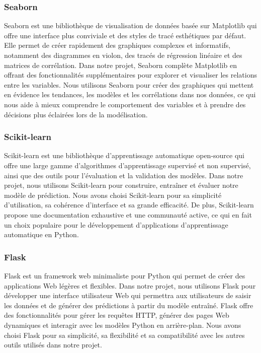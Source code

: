 \subsubsection{Seaborn}
Seaborn est une bibliothèque de visualisation de données basée sur Matplotlib qui offre une interface plus conviviale et des styles de tracé esthétiques par défaut. Elle permet de créer rapidement des graphiques complexes et informatifs, notamment des diagrammes en violon, des tracés de régression linéaire et des matrices de corrélation. Dans notre projet, Seaborn complète Matplotlib en offrant des fonctionnalités supplémentaires pour explorer et visualiser les relations entre les variables. Nous utilisons Seaborn pour créer des graphiques qui mettent en évidence les tendances, les modèles et les corrélations dans nos données, ce qui nous aide à mieux comprendre le comportement des variables et à prendre des décisions plus éclairées lors de la modélisation.

\subsubsection{Scikit-learn}
Scikit-learn est une bibliothèque d'apprentissage automatique open-source qui offre une large gamme d'algorithmes d'apprentissage supervisé et non supervisé, ainsi que des outils pour l'évaluation et la validation des modèles. Dans notre projet, nous utilisons Scikit-learn pour construire, entraîner et évaluer notre modèle de prédiction. Nous avons choisi Scikit-learn pour sa simplicité d'utilisation, sa cohérence d'interface et sa grande efficacité. De plus, Scikit-learn propose une documentation exhaustive et une communauté active, ce qui en fait un choix populaire pour le développement d'applications d'apprentissage automatique en Python.

\subsubsection{Flask}
Flask est un framework web minimaliste pour Python qui permet de créer des applications Web légères et flexibles. Dans notre projet, nous utilisons Flask pour développer une interface utilisateur Web qui permettra aux utilisateurs de saisir les données et de générer des prédictions à partir du modèle entraîné. Flask offre des fonctionnalités pour gérer les requêtes HTTP, générer des pages Web dynamiques et interagir avec les modèles Python en arrière-plan. Nous avons choisi Flask pour sa simplicité, sa flexibilité et sa compatibilité avec les autres outils utilisés dans notre projet.


